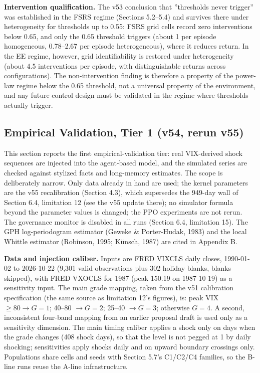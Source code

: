 \documentclass[11pt]{article}
\begin{document}
\textbf{Intervention qualification.} The v53 conclusion that ''thresholds never trigger'' was established in the FSRS regime (Sections 5.2--5.4) and survives there under heterogeneity for thresholds up to 0.55: FSRS grid cells record zero interventions below 0.65, and only the 0.65 threshold triggers (about 1 per episode homogeneous, 0.78--2.67 per episode heterogeneous), where it reduces return. In the EE regime, however, grid identifiability is restored under heterogeneity (about 4.5 interventions per episode, with distinguishable returns across configurations). The non-intervention finding is therefore a property of the power-law regime below the 0.65 threshold, not a universal property of the environment, and any future control design must be validated in the regime where thresholds actually trigger.

\subsection{Empirical Validation, Tier 1 (v54, rerun v55)}
This section reports the first empirical-validation tier: real VIX-derived shock sequences are injected into the agent-based model, and the simulated series are checked against stylized facts and long-memory estimates. The scope is deliberately narrow. Only data already in hand are used; the kernel parameters are the v55 recalibration (Section 4.3), which supersedes the 949-day wall of Section 6.4, limitation 12 (see the v55 update there); no simulator formula beyond the parameter values is changed; the PPO experiments are not rerun. The governance monitor is disabled in all runs (Section 6.4, limitation 15). The GPH log-periodogram estimator (Geweke \& Porter-Hudak, 1983) and the local Whittle estimator (Robinson, 1995; Künsch, 1987) are cited in Appendix B.

\textbf{Data and injection caliber.} Inputs are FRED VIXCLS daily closes, 1990-01-02 to 2026-10-22 (9,301 valid observations plus 302 holiday blanks, blanks skipped), with FRED VXOCLS for 1987 (peak 150.19 on 1987-10-19) as a sensitivity input. The main grade mapping, taken from the v51 calibration specification (the same source as limitation 12's figures), is: peak VIX $\geq 80 \rightarrow G=1$; 40--80 $\rightarrow G=2$; 25--40 $\rightarrow G=3$; otherwise $G=4$. A second, inconsistent four-band mapping from an earlier proposal draft is used only as a sensitivity dimension. The main timing caliber applies a shock only on days when the grade changes (408 shock days), so that the level is not pegged at 1 by daily shocking; sensitivities apply shocks daily and on upward boundary crossings only. Populations share cells and seeds with Section 5.7's C1/C2/C4 families, so the B-line runs reuse the A-line infrastructure.
\end{document}
